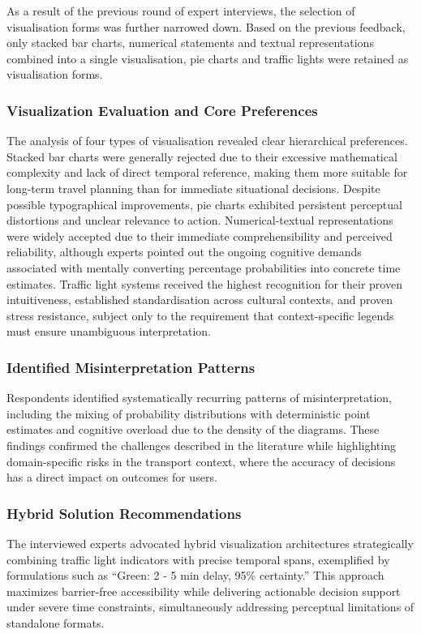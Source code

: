 \documentclass[final,journal,a4paper]{IEEEtran}
\begin{document}
As a result of the previous round of expert interviews, the selection of visualisation forms was further narrowed down. Based on the previous feedback, only stacked bar charts, numerical statements and textual representations combined into a single visualisation, pie charts and traffic lights were retained as visualisation forms.

\subsubsection{Visualization Evaluation and Core Preferences}
The analysis of four types of visualisation revealed clear hierarchical preferences. Stacked bar charts were generally rejected due to their excessive mathematical complexity and lack of direct temporal reference, making them more suitable for long-term travel planning than for immediate situational decisions. Despite possible typographical improvements, pie charts exhibited persistent perceptual distortions and unclear relevance to action. Numerical-textual representations were widely accepted due to their immediate comprehensibility and perceived reliability, although experts pointed out the ongoing cognitive demands associated with mentally converting percentage probabilities into concrete time estimates. Traffic light systems received the highest recognition for their proven intuitiveness, established standardisation across cultural contexts, and proven stress resistance, subject only to the requirement that context-specific legends must ensure unambiguous interpretation.

\subsubsection{Identified Misinterpretation Patterns}
Respondents identified systematically recurring patterns of misinterpretation, including the mixing of probability distributions with deterministic point estimates and cognitive overload due to the density of the diagrams. These findings confirmed the challenges described in the literature while highlighting domain-specific risks in the transport context, where the accuracy of decisions has a direct impact on outcomes for users.

\subsubsection{Hybrid Solution Recommendations}
The interviewed experts advocated hybrid visualization architectures strategically combining traffic light indicators with precise temporal spans, exemplified by formulations such as ``Green: 2 - 5 min delay, 95\% certainty.'' This approach maximizes barrier-free accessibility while delivering actionable decision support under severe time constraints, simultaneously addressing perceptual limitations of standalone formats.
\end{document}
